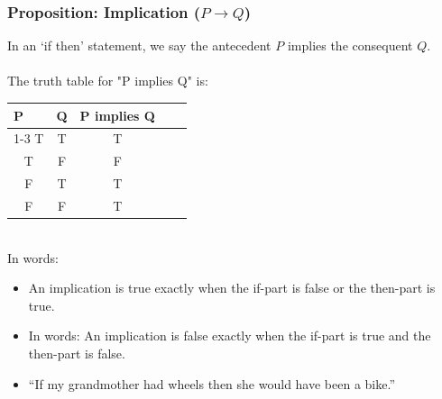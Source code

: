 \documentclass[aspectratio=169, handout]{beamer}
\numberwithin{equation}{section}
\begin{document}
\begin{frame}
\frametitle{Proposition: Implication ($P\rightarrow Q$)}

In an `if then' statement, we say the antecedent $P$ implies the consequent $Q$.\\

\ \\The truth table for "P implies Q" is:

\begin{table}[]
\begin{tabular}{cccll}
\multicolumn{1}{l}{P} & \multicolumn{1}{l}{Q} & \multicolumn{1}{l}{P implies Q} &  &  \\ \cline{1-3}
T                     & T                     & T                               &  &  \\
T                     & F                     & F                               &  &  \\
F                     & T                     & T                               &  &  \\
F                     & F                     & T                               &  & 
\end{tabular}
\end{table} \pause

\ \\In words: 
\begin{itemize}
\item An implication is true exactly when the if-part is false or the then-part is true. 
\item In words: An implication is false exactly when the if-part is true and the then-part is false. 
\pause
\item ``If my grandmother had wheels then she would have been a bike.''
\end{itemize}
\end{frame}
\end{document}
